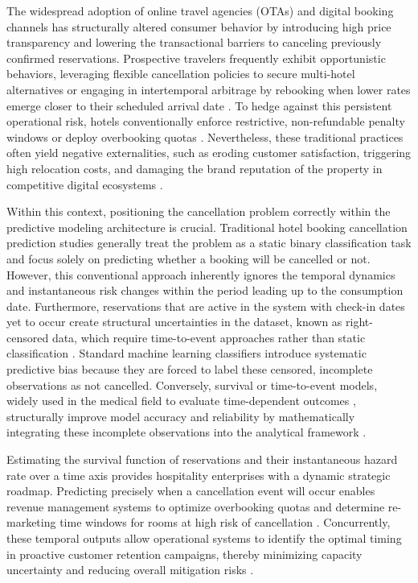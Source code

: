 \documentclass[pdflatex,sn-mathphys-ay]{sn-jnl}%
\theoremstyle{thmstyleone}%
\theoremstyle{thmstyletwo}%
\theoremstyle{thmstylethree}%
\begin{document}
The widespread adoption of online travel agencies (OTAs) and digital booking channels has structurally altered consumer behavior by introducing high price transparency and lowering the transactional barriers to canceling previously confirmed reservations. Prospective travelers frequently exhibit opportunistic behaviors, leveraging flexible cancellation policies to secure multi-hotel alternatives \citep{chen2023prediction} or engaging in intertemporal arbitrage by rebooking when lower rates emerge \citep{mir2026decoding} closer to their scheduled arrival date \citep{ampountolas2025predicting}. To hedge against this persistent operational risk, hotels conventionally enforce restrictive, non-refundable penalty windows \citep{yang2024predicting} or deploy overbooking quotas \citep{antonio2017predicting}. Nevertheless, these traditional practices often yield negative externalities, such as eroding customer satisfaction, triggering high relocation costs, and damaging the brand reputation of the property in competitive digital ecosystems \citep{falk2018modelling}.

Within this context, positioning the cancellation problem correctly within the predictive modeling architecture is crucial. Traditional hotel booking cancellation prediction studies generally treat the problem as a static binary classification task and focus solely on predicting whether a booking will be cancelled or not. However, this conventional approach inherently ignores the temporal dynamics and instantaneous risk changes within the period leading up to the consumption date. Furthermore, reservations that are active in the system with check-in dates yet to occur create structural uncertainties in the dataset, known as right-censored data, which require time-to-event approaches rather than static classification \citep{krzyzinski2023survshapt}. Standard machine learning classifiers introduce systematic predictive bias because they are forced to label these censored, incomplete observations as not cancelled. Conversely, survival or time-to-event models, widely used in the medical field to evaluate time-dependent outcomes \citep{kovalev2020survlime}, structurally improve model accuracy and reliability by mathematically integrating these incomplete observations into the analytical framework \citep{langbein2025interpretable}.

Estimating the survival function of reservations and their instantaneous hazard rate over a time axis provides hospitality enterprises with a dynamic strategic roadmap. Predicting precisely when a cancellation event will occur enables revenue management systems to optimize overbooking quotas and determine re-marketing time windows for rooms at high risk of cancellation \citep{mir2026decoding}. Concurrently, these temporal outputs allow operational systems to identify the optimal timing in proactive customer retention campaigns, thereby minimizing capacity uncertainty \citep{ampountolas2025predicting} and reducing overall mitigation risks \citep{antonio2017predicting}.
\end{document}
